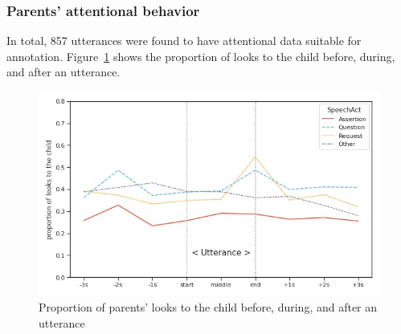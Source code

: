 \subsubsection{Parents' attentional behavior}
\label{sec:engsp:results:gaze}

In total, 857 utterances were found to have attentional data suitable for annotation. Figure~\ref{fig:attention} shows the proportion of looks to the child before, during, and after an utterance.


\begin{figure}[H]

\begin{center}
	\includegraphics[width =1\textwidth]{figures/gaze-pattern-adult.jpg}
	\caption{Proportion of parents' looks to the child before, during, and after an utterance} \label{fig:attention}
\end{center}
\end{figure}


